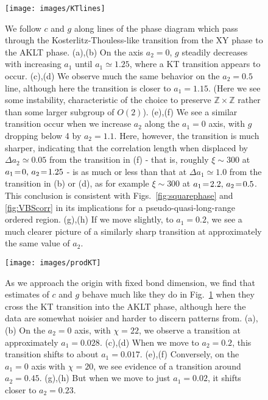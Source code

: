 \documentclass[aps,prb,letterpaper,superscriptaddress,twocolumn,showpacs,floatfix,10pt]{revtex4-1}
\begin{document}
\begin{figure}
\texttt{[image: images/KTlines]}
\caption{We follow $c$ and $g$ along lines of the phase diagram which
pass through the Kosterlitz-Thouless-like transition from the XY phase to the
AKLT phase.
(a),(b) On the axis $a_2=0$, $g$ steadily decreases with increasing $a_1$ until 
$a_1 \simeq 1.25$, where a KT transition appears to occur. (c),(d) We observe
much the same behavior on the $a_2=0.5$ line, although here the transition
is closer to $a_1 = 1.15$. (Here we see some instability, characteristic of
the choice to preserve $\mathbb{Z}\times\mathbb{Z}$ rather than some larger
subgroup of $O(2)$). (e),(f) We
see a similar transition occur when we increase $a_2$ along the $a_1=0$
axis, with $g$ dropping below 4 by $a_2 = 1.1$. Here, however, the
transition is much sharper, indicating that the correlation length when
displaced by
$\Delta a_2 \simeq 0.05$ from the transition in (f) - that is, roughly
$\xi \sim 300$ at $a_1\nobreak\!=\nobreak\!0, \,a_2\nobreak\!=\nobreak\!1.25$ - is as much or less than that at
$\Delta a_1 \simeq 1.0$ from the transition in (b) or (d), as for
example $\xi \sim 300$ at $a_1\nobreak\!=\nobreak\!2.2, \,a_2\nobreak\!=\nobreak\!0.5$. This conclusion
is consistent with Figs.~\ref{fig:squarephase} and \ref{fig:VBScorr} in
its implications for a pseudo-quasi-long-range ordered region.
(g),(h) If we move slightly, to $a_1=0.2$, we see a much clearer
picture of a similarly sharp transition at
approximately the same value of $a_2$.}
\label{fig:KTlines}
\end{figure}

\begin{figure}
\texttt{[image: images/prodKT]}
\caption{As we approach the origin with fixed bond dimension, we find that
estimates of $c$ and $g$ behave much like they do in Fig.~\ref{fig:KTlines}
when they cross the KT
transition into the AKLT phase, although here the data are somewhat noisier and
harder to discern patterns from. (a),(b) On the $a_2=0$ axis, with $\chi=22$, we
observe a transition at approximately $a_1 = 0.028$. (c),(d) When we move to
$a_2=0.2$, this transition shifts to about $a_1 = 0.017$. (e),(f) Conversely,
on the $a_1=0$ axis with $\chi=20$, we see evidence of a transition around
$a_2 = 0.45$. (g),(h) But when we move to just $a_1 = 0.02$, it shifts closer
to $a_2 = 0.23$.}
\label{fig:prodKT}
\end{figure}
\end{document}
